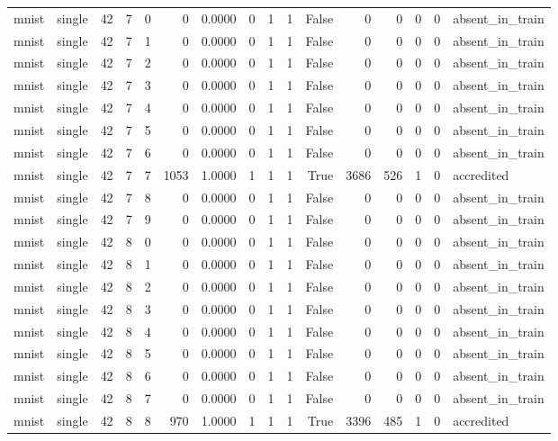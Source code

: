 \begin{tabular}{llrrrrrrrrrrrrrl}
mnist & single & 42 & 7 & 0 & 0 & 0.0000 & 0 & 1 & 1 & False & 0 & 0 & 0 & 0 & absent\_in\_train \\
mnist & single & 42 & 7 & 1 & 0 & 0.0000 & 0 & 1 & 1 & False & 0 & 0 & 0 & 0 & absent\_in\_train \\
mnist & single & 42 & 7 & 2 & 0 & 0.0000 & 0 & 1 & 1 & False & 0 & 0 & 0 & 0 & absent\_in\_train \\
mnist & single & 42 & 7 & 3 & 0 & 0.0000 & 0 & 1 & 1 & False & 0 & 0 & 0 & 0 & absent\_in\_train \\
mnist & single & 42 & 7 & 4 & 0 & 0.0000 & 0 & 1 & 1 & False & 0 & 0 & 0 & 0 & absent\_in\_train \\
mnist & single & 42 & 7 & 5 & 0 & 0.0000 & 0 & 1 & 1 & False & 0 & 0 & 0 & 0 & absent\_in\_train \\
mnist & single & 42 & 7 & 6 & 0 & 0.0000 & 0 & 1 & 1 & False & 0 & 0 & 0 & 0 & absent\_in\_train \\
mnist & single & 42 & 7 & 7 & 1053 & 1.0000 & 1 & 1 & 1 & True & 3686 & 526 & 1 & 0 & accredited \\
mnist & single & 42 & 7 & 8 & 0 & 0.0000 & 0 & 1 & 1 & False & 0 & 0 & 0 & 0 & absent\_in\_train \\
mnist & single & 42 & 7 & 9 & 0 & 0.0000 & 0 & 1 & 1 & False & 0 & 0 & 0 & 0 & absent\_in\_train \\
mnist & single & 42 & 8 & 0 & 0 & 0.0000 & 0 & 1 & 1 & False & 0 & 0 & 0 & 0 & absent\_in\_train \\
mnist & single & 42 & 8 & 1 & 0 & 0.0000 & 0 & 1 & 1 & False & 0 & 0 & 0 & 0 & absent\_in\_train \\
mnist & single & 42 & 8 & 2 & 0 & 0.0000 & 0 & 1 & 1 & False & 0 & 0 & 0 & 0 & absent\_in\_train \\
mnist & single & 42 & 8 & 3 & 0 & 0.0000 & 0 & 1 & 1 & False & 0 & 0 & 0 & 0 & absent\_in\_train \\
mnist & single & 42 & 8 & 4 & 0 & 0.0000 & 0 & 1 & 1 & False & 0 & 0 & 0 & 0 & absent\_in\_train \\
mnist & single & 42 & 8 & 5 & 0 & 0.0000 & 0 & 1 & 1 & False & 0 & 0 & 0 & 0 & absent\_in\_train \\
mnist & single & 42 & 8 & 6 & 0 & 0.0000 & 0 & 1 & 1 & False & 0 & 0 & 0 & 0 & absent\_in\_train \\
mnist & single & 42 & 8 & 7 & 0 & 0.0000 & 0 & 1 & 1 & False & 0 & 0 & 0 & 0 & absent\_in\_train \\
mnist & single & 42 & 8 & 8 & 970 & 1.0000 & 1 & 1 & 1 & True & 3396 & 485 & 1 & 0 & accredited \\

\end{tabular}
